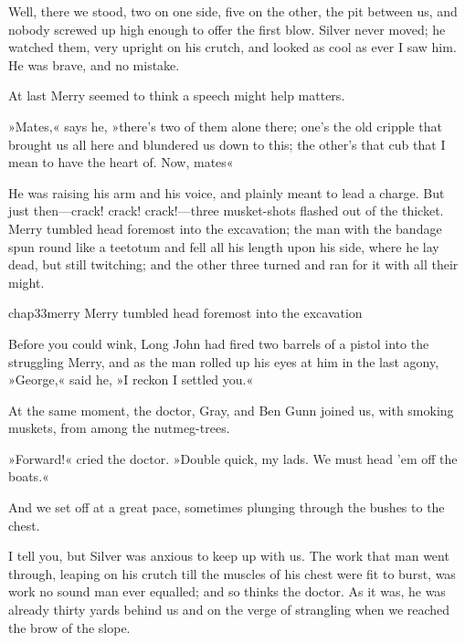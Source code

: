 Well, there we stood, two on one side, five on the other, the pit between us, and nobody screwed up high enough to offer the first blow. Silver never moved; he watched them, very upright on his crutch, and looked as cool as ever I saw him. He was brave, and no mistake.

At last Merry seemed to think a speech might help matters.

»Mates,« says he, »there's two of them alone there; one's the old cripple that brought us all here and blundered us down to this; the other's that cub that I mean to have the heart of. Now, mates\longdash«

He was raising his arm and his voice, and plainly meant to lead a charge. But just then—crack! crack! crack!—three musket-shots flashed out of the thicket. Merry tumbled head foremost into the excavation; the man with the bandage spun round like a teetotum and fell all his length upon his side, where he lay dead, but still twitching; and the other three turned and ran for it with all their might.


\begin{bwbigpic}
	[\picsize]
	{chap33merry}
	{Merry tumbled head foremost into the excavation}
\end{bwbigpic}

Before you could wink, Long John had fired two barrels of a pistol into the struggling Merry, and as the man rolled up his eyes at him in the last agony, »George,« said he, »I reckon I settled you.«

At the same moment, the doctor, Gray, and Ben Gunn joined us, with smoking muskets, from among the nutmeg-trees.

»Forward!« cried the doctor. »Double quick, my lads. We must head 'em off the boats.«

And we set off at a great pace, sometimes plunging through the bushes to the chest.

I tell you, but Silver was anxious to keep up with us. The work that man went through, leaping on his crutch till the muscles of his chest were fit to burst, was work no sound man ever equalled; and so thinks the doctor. As it was, he was already thirty yards behind us and on the verge of strangling when we reached the brow of the slope.

